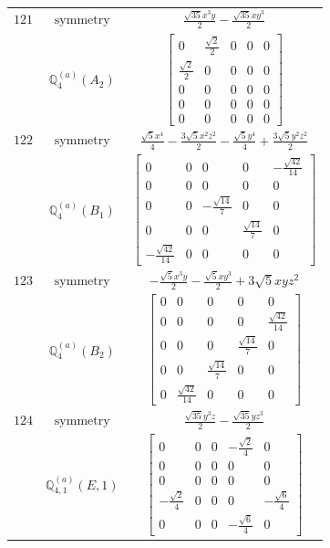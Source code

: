 \documentclass[fleqn,8pt,landscape]{jsarticle}
\begin{document}
\begin{longtable}{ccc}
$ 121 $ & $ \text{symmetry} $ & $ \frac{\sqrt{35} x^{3} y}{2} - \frac{\sqrt{35} x y^{3}}{2} $ \\
$  $ & $ \mathbb{Q}_{4}^{(a)}(A_{2}) $ & $ \begin{bmatrix} 0 & \frac{\sqrt{2}}{2} & 0 & 0 & 0 \\ \frac{\sqrt{2}}{2} & 0 & 0 & 0 & 0 \\ 0 & 0 & 0 & 0 & 0 \\ 0 & 0 & 0 & 0 & 0 \\ 0 & 0 & 0 & 0 & 0 \end{bmatrix} $ \\ \hline
$ 122 $ & $ \text{symmetry} $ & $ \frac{\sqrt{5} x^{4}}{4} - \frac{3 \sqrt{5} x^{2} z^{2}}{2} - \frac{\sqrt{5} y^{4}}{4} + \frac{3 \sqrt{5} y^{2} z^{2}}{2} $ \\
$  $ & $ \mathbb{Q}_{4}^{(a)}(B_{1}) $ & $ \begin{bmatrix} 0 & 0 & 0 & 0 & - \frac{\sqrt{42}}{14} \\ 0 & 0 & 0 & 0 & 0 \\ 0 & 0 & - \frac{\sqrt{14}}{7} & 0 & 0 \\ 0 & 0 & 0 & \frac{\sqrt{14}}{7} & 0 \\ - \frac{\sqrt{42}}{14} & 0 & 0 & 0 & 0 \end{bmatrix} $ \\ \hline
$ 123 $ & $ \text{symmetry} $ & $ - \frac{\sqrt{5} x^{3} y}{2} - \frac{\sqrt{5} x y^{3}}{2} + 3 \sqrt{5} x y z^{2} $ \\
$  $ & $ \mathbb{Q}_{4}^{(a)}(B_{2}) $ & $ \begin{bmatrix} 0 & 0 & 0 & 0 & 0 \\ 0 & 0 & 0 & 0 & \frac{\sqrt{42}}{14} \\ 0 & 0 & 0 & \frac{\sqrt{14}}{7} & 0 \\ 0 & 0 & \frac{\sqrt{14}}{7} & 0 & 0 \\ 0 & \frac{\sqrt{42}}{14} & 0 & 0 & 0 \end{bmatrix} $ \\ \hline
$ 124 $ & $ \text{symmetry} $ & $ \frac{\sqrt{35} y^{3} z}{2} - \frac{\sqrt{35} y z^{3}}{2} $ \\
$  $ & $ \mathbb{Q}_{4,1}^{(a)}(E,1) $ & $ \begin{bmatrix} 0 & 0 & 0 & - \frac{\sqrt{2}}{4} & 0 \\ 0 & 0 & 0 & 0 & 0 \\ 0 & 0 & 0 & 0 & 0 \\ - \frac{\sqrt{2}}{4} & 0 & 0 & 0 & - \frac{\sqrt{6}}{4} \\ 0 & 0 & 0 & - \frac{\sqrt{6}}{4} & 0 \end{bmatrix} $ \\ \hline

\end{longtable}
\end{document}
